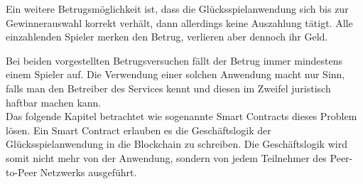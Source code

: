 Ein weitere Betrugsmöglichkeit ist, dass die Glücksspielanwendung sich bis zur Gewinnerauswahl korrekt verhält, dann allerdings keine Auszahlung tätigt. Alle einzahlenden Spieler merken den Betrug, verlieren aber dennoch ihr Geld.

Bei beiden vorgestellten Betrugsversuchen fällt der Betrug immer mindestens einem Spieler auf. Die Verwendung einer solchen Anwendung macht nur Sinn, falls man den Betreiber des Services kennt und diesen im Zweifel juristisch haftbar machen kann.\\
Das folgende Kapitel betrachtet wie sogenannte Smart Contracts dieses Problem lösen. Ein Smart Contract erlauben es die Geschäftslogik der Glücksspielanwendung in die Blockchain zu schreiben. Die Geschäftslogik wird somit nicht mehr von der Anwendung, sondern von jedem Teilnehmer des Peer-to-Peer Netzwerks ausgeführt.